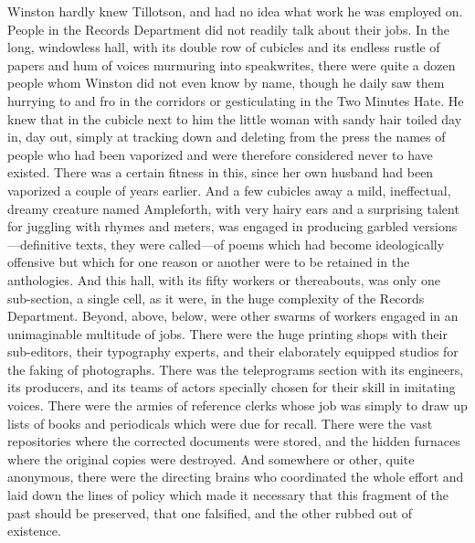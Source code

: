 \begin{paracol}{2}
Winston hardly knew Tillotson, and had no idea what work he was employed
on. People in the Records Department did not readily talk about their
jobs. In the long, windowless hall, with its double row of cubicles and
its endless rustle of papers and hum of voices murmuring into
speakwrites, there were quite a dozen people whom Winston did not even
know by name, though he daily saw them hurrying to and fro in the
corridors or gesticulating in the Two Minutes Hate. He knew that in the
cubicle next to him the little woman with sandy hair toiled day in, day
out, simply at tracking down and deleting from the press the names of
people who had been vaporized and were therefore considered never to
have existed. There was a certain fitness in this, since her own husband
had been vaporized a couple of years earlier. And a few cubicles away a
mild, ineffectual, dreamy creature named Ampleforth, with very hairy
ears and a surprising talent for juggling with rhymes and meters, was
engaged in producing garbled versions---definitive texts, they were
called---of poems which had become ideologically offensive but which for
one reason or another were to be retained in the anthologies. And this
hall, with its fifty workers or thereabouts, was only one sub-section, a
single cell, as it were, in the huge complexity of the Records
Department. Beyond, above, below, were other swarms of workers engaged
in an unimaginable multitude of jobs. There were the huge printing shops
with their sub-editors, their typography experts, and their elaborately
equipped studios for the faking of photographs. There was the
teleprograms section with its engineers, its producers, and its teams of
actors specially chosen for their skill in imitating voices. There were
the armies of reference clerks whose job was simply to draw up lists of
books and periodicals which were due for recall. There were the vast
repositories where the corrected documents were stored, and the hidden
furnaces where the original copies were destroyed. And somewhere or
other, quite anonymous, there were the directing brains who coordinated
the whole effort and laid down the lines of policy which made it
necessary that this fragment of the past should be preserved, that one
falsified, and the other rubbed out of existence.

\switchcolumn


\end{paracol}
